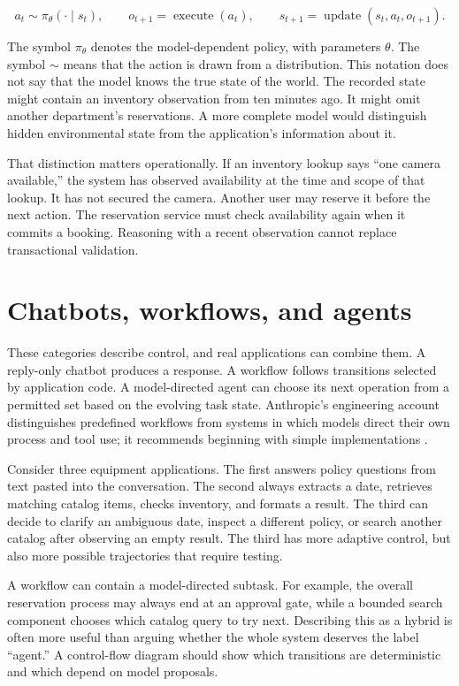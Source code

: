 \begin{equation}
a_t \sim \pi_{\theta}(\cdot\mid s_t),\qquad o_{t+1}=\operatorname{execute}(a_t),\qquad s_{t+1}=\operatorname{update}(s_t,a_t,o_{t+1}).
\end{equation}

The symbol \(\pi_{\theta}\) denotes the model-dependent policy, with parameters \(\theta\). The symbol \(\sim\) means that the action is drawn from a distribution. This notation does not say that the model knows the true state of the world. The recorded state might contain an inventory observation from ten minutes ago. It might omit another department's reservations. A more complete model would distinguish hidden environmental state from the application's information about it.

That distinction matters operationally. If an inventory lookup says “one camera available,” the system has observed availability at the time and scope of that lookup. It has not secured the camera. Another user may reserve it before the next action. The reservation service must check availability again when it commits a booking. Reasoning with a recent observation cannot replace transactional validation.

\section{Chatbots, workflows, and agents}
These categories describe control, and real applications can combine them. A reply-only chatbot produces a response. A workflow follows transitions selected by application code. A model-directed agent can choose its next operation from a permitted set based on the evolving task state. Anthropic's engineering account distinguishes predefined workflows from systems in which models direct their own process and tool use; it recommends beginning with simple implementations \cite{effective-agents}.

Consider three equipment applications. The first answers policy questions from text pasted into the conversation. The second always extracts a date, retrieves matching catalog items, checks inventory, and formats a result. The third can decide to clarify an ambiguous date, inspect a different policy, or search another catalog after observing an empty result. The third has more adaptive control, but also more possible trajectories that require testing.

A workflow can contain a model-directed subtask. For example, the overall reservation process may always end at an approval gate, while a bounded search component chooses which catalog query to try next. Describing this as a hybrid is often more useful than arguing whether the whole system deserves the label “agent.” A control-flow diagram should show which transitions are deterministic and which depend on model proposals.

